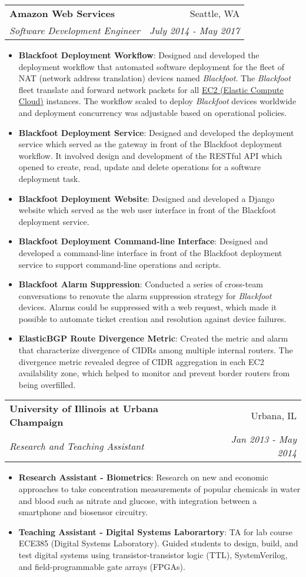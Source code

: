 \documentclass[letterpaper,11pt]{article}
\makeatletter
\newcommand{\resumeItem}[2]{
  \item\small{
    \textbf{#1}{: #2 \vspace{-2pt}}
  }
}
\newcommand{\resumeSubheading}[4]{
  \vspace{-1pt}\item
    \begin{tabular*}{0.97\textwidth}{l@{\extracolsep{\fill}}r}
      \textbf{#1} & #2 \\
      \textit{\small#3} & \textit{\small #4} \\
    \end{tabular*}\vspace{-5pt}
}
\newcommand{\resumeItemListStart}{\begin{itemize}}
\newcommand{\resumeItemListEnd}{\end{itemize}\vspace{-5pt}}
\makeatother
\begin{document}
    \resumeSubheading
      {Amazon Web Services}{Seattle, WA}
      {Software Development Engineer}{July 2014 - May 2017}
      \resumeItemListStart
        \resumeItem{Blackfoot Deployment Workflow}
          {Designed and developed the deployment workflow that automated software deployment for the fleet of NAT (network address translation) devices named \textit{Blackfoot}. The \textit{Blackfoot} fleet translate and forward network packets for all \href{https://aws.amazon.com/ec2/}{EC2 (Elastic Compute Cloud)} instances. The workflow scaled to deploy \textit{Blackfoot} devices worldwide and deployment concurrency was adjustable based on operational policies.}
        \resumeItem{Blackfoot Deployment Service}
          {Designed and developed the deployment service which served as the gateway in front of the Blackfoot deployment workflow. It involved design and development of the RESTful API which opened to create, read, update and delete operations for a software deployment task.}
        \resumeItem{Blackfoot Deployment Website}
          {Designed and developed a Django website which served as the web user interface in front of the Blackfoot deployment service.}
        \resumeItem{Blackfoot Deployment Command-line Interface}
          {Designed and developed a command-line interface in front of the Blackfoot deployment service to support command-line operations and scripts.}
        \resumeItem{Blackfoot Alarm Suppression}
          {Conducted a series of cross-team conversations to renovate the alarm suppression strategy for \textit{Blackfoot} devices. Alarms could be suppressed with a web request, which made it possible to automate ticket creation and resolution against device failures.  }
        \resumeItem{ElasticBGP Route Divergence Metric}
          {Created the metric and alarm that characterize divergence of CIDRs among multiple internal routers. The divergence metric revealed degree of CIDR aggregation in each EC2 availability zone, which helped to monitor and prevent border routers from being overfilled.}
      \resumeItemListEnd

    \resumeSubheading
      {University of Illinois at Urbana Champaign}{Urbana, IL}
      {Research and Teaching Assistant}{Jan 2013 - May 2014}
      \resumeItemListStart
        \resumeItem{Research Assistant - Biometrics}
          {Research on new and economic approaches to take concentration measurements of popular chemicals in water and blood such as nitrate and glucose, with integration between a smartphone and biosensor circuitry.}
        \resumeItem{Teaching Assistant - Digital Systems Laborartory}
          {TA for lab course ECE385 (Digital Systems Laboratory). Guided students to design, build, and test digital systems using transistor-transistor logic (TTL), SystemVerilog, and field-programmable gate arrays (FPGAs).}
      \resumeItemListEnd
\end{document}
